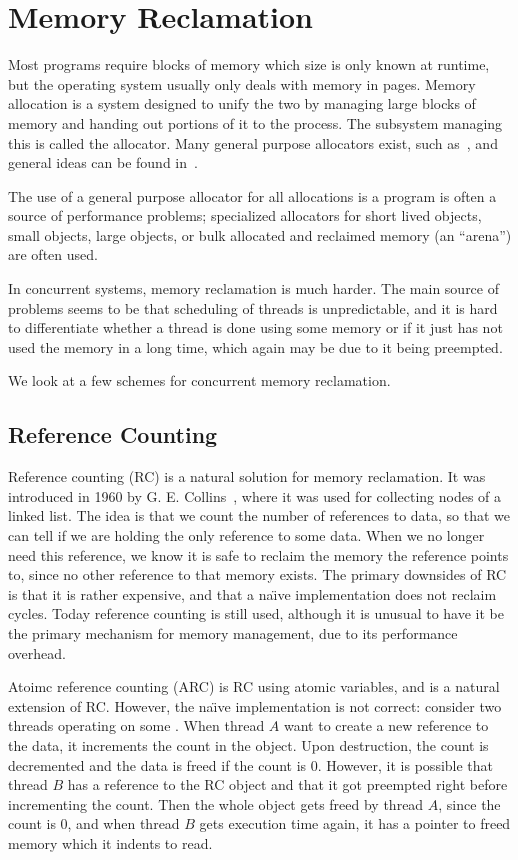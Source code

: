 \section{Memory Reclamation}

Most programs require blocks of memory which size is only known at runtime, but the operating
system usually only deals with memory in pages. Memory allocation is a system designed to unify the
two by managing large blocks of memory and handing out portions of it to the process. The subsystem
managing this is called the allocator. Many general purpose allocators exist, such as~\cite{glibc-malloc,jemalloc,tcmalloc}, and general ideas can be found in~\cite{knuth1997vol1}.

The use of a general purpose allocator for all allocations is a program is often a source of
performance problems; specialized allocators for short lived objects, small objects, large objects,
or bulk allocated and reclaimed memory (an ``arena'') are often used.

In concurrent systems, memory reclamation is much harder. The main source of problems seems to be
that scheduling of threads is unpredictable, and it is hard to differentiate whether a thread is
done using some memory or if it just has not used the memory in a long time, which again may be due
to it being preempted.

We look at a few schemes for concurrent memory reclamation.


\subsection{Reference Counting\label{sec:background-rc}}

Reference counting (RC) is a natural solution for memory reclamation. It was introduced in 1960 by
G. E.  Collins~\cite{collins1960method}, where it was used for collecting nodes of a linked list.
The idea is that we count the number of references to data, so that we can tell if we are holding
the only reference to some data. When we no longer need this reference, we know it is safe to
reclaim the memory the reference points to, since no other reference to that memory exists. The
primary downsides of RC is that it is rather expensive, and that a na\"\i{}ve implementation does
not reclaim cycles. Today reference counting is still used, although it is unusual to have it be
the primary mechanism for memory management, due to its performance overhead.

Atoimc reference counting (ARC) is RC using atomic variables, and is a natural extension of RC\@.
However, the na\"\i{}ve implementation is not correct: consider two threads operating on some
. When thread $A$ want to create a new reference to the data, it increments the count
in the  object. Upon destruction, the count is decremented and the data is freed if the
count is 0. However, it is possible that thread $B$ has a reference to the RC object and that it
got preempted right before incrementing the count. Then the whole object gets freed by thread $A$,
since the count is 0, and when thread $B$ gets execution time again, it has a pointer to freed
memory which it indents to read.

